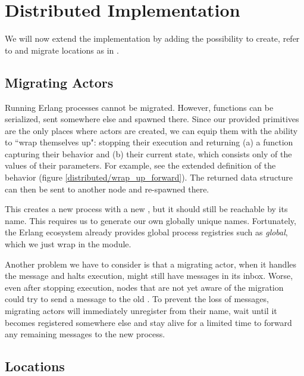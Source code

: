 \section{Distributed Implementation}

We will now extend the implementation by adding the possibility to
create, refer to and migrate locations as in \distjoincalc.


\subsection{Migrating Actors}
\label{ch_migration}

Running Erlang processes cannot be migrated.
However, functions can be serialized, sent somewhere else and spawned there.
Since our provided primitives are the only places where actors are created,
we can equip them with the ability to ``wrap themselves up":
stopping their execution and returning
(a) a function capturing their behavior and
(b) their current state, which consists only of the values of their parameters.
For example, see the extended definition of the  behavior
(figure \ref{distributed/wrap_up_forward}).
The returned data structure can then be sent to another node
and re-spawned there.


This creates a new process with a new \PID,
but it should still be reachable by its name.
This requires us to generate our own globally unique names.
Fortunately, the Erlang ecosystem already provides global process registries
such as \emph{global}, which we just wrap in the  module.

Another problem we have to consider is that a migrating actor,
when it handles the  message and halts execution,
might still have messages in its inbox.
Worse, even after stopping execution,
nodes that are not yet aware of the migration
could try to send a message to the old \PID.
To prevent the loss of messages, migrating actors will immediately unregister
from their name, wait until it becomes registered somewhere else
and stay alive for a limited time to forward any remaining messages
to the new process.


\subsection{Locations}

